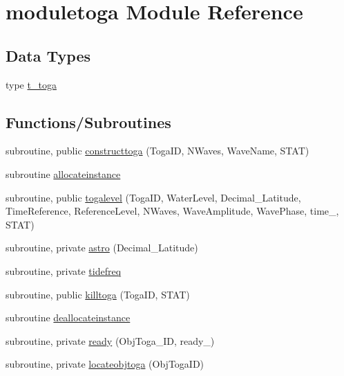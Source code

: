 \hypertarget{namespacemoduletoga}{}\section{moduletoga Module Reference}
\label{namespacemoduletoga}
\subsection*{Data Types}
\begin{DoxyCompactItemize}
\item 
type \mbox{\hyperlink{structmoduletoga_1_1t__toga}{t\+\_\+toga}}
\end{DoxyCompactItemize}
\subsection*{Functions/\+Subroutines}
\begin{DoxyCompactItemize}
\item 
subroutine, public \mbox{\hyperlink{namespacemoduletoga_a49f980ff51e54f1045b60179a9ab5226}{constructtoga}} (Toga\+ID, N\+Waves, Wave\+Name, S\+T\+AT)
\item 
subroutine \mbox{\hyperlink{namespacemoduletoga_a307ed1550871bbb2f18f8facda132b11}{allocateinstance}}
\item 
subroutine, public \mbox{\hyperlink{namespacemoduletoga_a42e9e4f606a8d51d59a07cbe2c0a1299}{togalevel}} (Toga\+ID, Water\+Level, Decimal\+\_\+\+Latitude, Time\+Reference, Reference\+Level, N\+Waves, Wave\+Amplitude, Wave\+Phase, time\+\_\+, S\+T\+AT)
\item 
subroutine, private \mbox{\hyperlink{namespacemoduletoga_ae4a4ae3ca80be3e56570e30a039abd61}{astro}} (Decimal\+\_\+\+Latitude)
\item 
subroutine, private \mbox{\hyperlink{namespacemoduletoga_a910478c59872b8cd57611ae642b29980}{tidefreq}}
\item 
subroutine, public \mbox{\hyperlink{namespacemoduletoga_a9aa03039890445420290aa3feba13a89}{killtoga}} (Toga\+ID, S\+T\+AT)
\item 
subroutine \mbox{\hyperlink{namespacemoduletoga_a0c38f2a3f8f7a4b798bbc4b523196742}{deallocateinstance}}
\item 
subroutine, private \mbox{\hyperlink{namespacemoduletoga_a62311ad918280d20f2f5383ab0a8dac4}{ready}} (Obj\+Toga\+\_\+\+ID, ready\+\_\+)
\item 
subroutine, private \mbox{\hyperlink{namespacemoduletoga_a0dcf3a4301085371bb48ab041d1cec59}{locateobjtoga}} (Obj\+Toga\+ID)
\end{DoxyCompactItemize}
